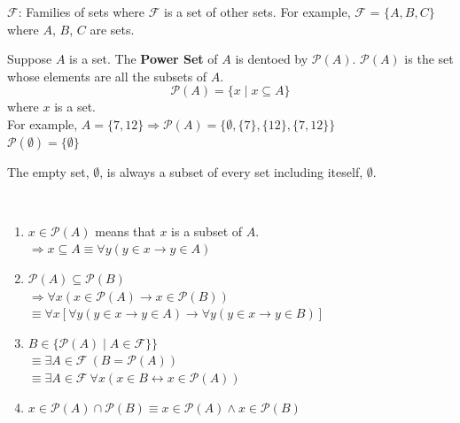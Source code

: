 \documentclass[../setup.tex]{subfiles}
\begin{document}
\clearpage

\begin{theorem}
$\mathcal{F}$: Families of sets where $\mathcal{F}$ is a set of other sets. For example, $\mathcal{F}$ = $\{A, B, C\}$ where $A$, $B$, $C$ are sets.
\end{theorem}

\begin{theorem}
Suppose $A$ is a set. The \textbf{Power Set} of $A$ is dentoed by $\mathcal{P}(A)$. $\mathcal{P}(A)$ is the set whose elements are all the subsets of $A$. \\
\[\mathcal{P}(A) = \{x \mid x \subseteq A\}\]
where $x$ is a set. \\
For example, $A = \{7, 12\} \Rightarrow \mathcal{P}(A) = \{\emptyset, \{7\}, \{12\}, \{7, 12\}\}$ \\
$\mathcal{P}(\emptyset) = \{\emptyset\}$
\end{theorem}
\begin{remark}
The empty set, $\emptyset$, is always a subset of every set including iteself, $\emptyset$. 
\end{remark}

\begin{example}
\phantom \\
\begin{enumerate}
	\item $x \in \mathcal{P}(A)$ means that $x$ is a subset of $A$. \\
		$\Rightarrow x \subseteq A \equiv \forall y (y \in x \rightarrow y \in A)$
	\item $\mathcal{P}(A) \subseteq \mathcal{P}(B)$ \\
		$\Rightarrow \forall x \left(x \in \mathcal{P}(A) \rightarrow x \in \mathcal{P}(B)\right)$ \\
		$\equiv \forall x \left[\forall y (y \in x \rightarrow y \in A) \rightarrow \forall y (y \in x \rightarrow y \in B)\right]$	
	\item $B \in \{\mathcal{P}(A) \mid A \in \mathcal{F}\}\}$ \\
		$\equiv \exists A \in \mathcal{F} \ (B = \mathcal{P}(A))$ \\
		$\equiv \exists A \in \mathcal{F} \ \forall x (x \in B \longleftrightarrow x \in \mathcal{P}(A))$
	\item $x \in \mathcal{P}(A) \cap \mathcal{P}(B) \equiv x \in \mathcal{P}(A) \land x \in \mathcal{P}(B)$
\end{enumerate}
\end{example}
\end{document}
